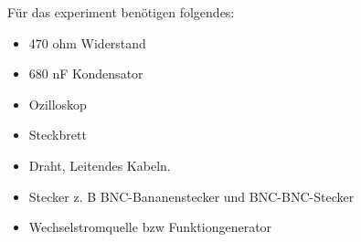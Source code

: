 Für das experiment benötigen folgendes:
\begin{itemize}
    \item 470 ohm Widerstand
    \item 680 nF Kondensator
    \item Ozilloskop
    \item Steckbrett
    \item Draht, Leitendes Kabeln. 
    \item Stecker z. B BNC-Bananenstecker und BNC-BNC-Stecker
    \item Wechselstromquelle bzw Funktiongenerator
\end{itemize}
%
%
%
%
%
%
%
\newpage
